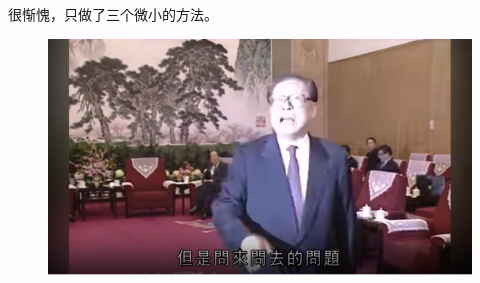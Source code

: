 \documentclass{beamer}
\begin{document}
\begin{frame}
很惭愧，只做了三个微小的方法。

\begin{figure}[htb]
    \includegraphics[width=0.9\linewidth]{elder.png}
\end{figure}
    
\end{frame}
\end{document}
